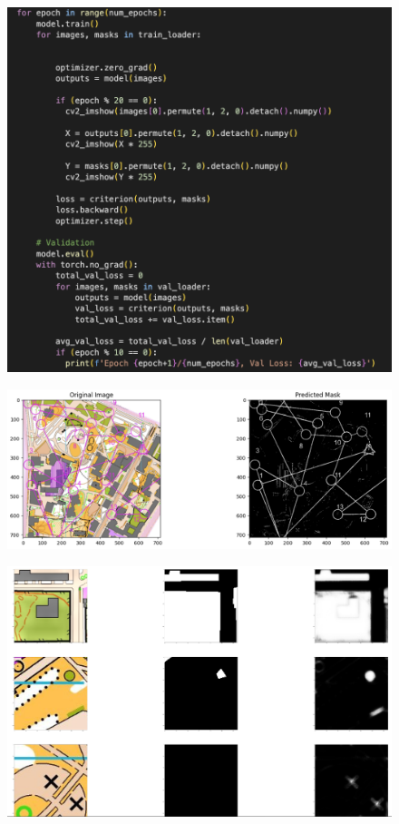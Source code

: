 \documentclass[a4paper,12pt]{extarticle}
\begin{document}
\begin{figure}[H]
    \centering
    \includegraphics[width=400pt]{CNN training loop.png}
    \label{fig:training-loop}
\end{figure}
\begin{figure}[H]
    \centering
    \includegraphics[width=\linewidth]{Predicted mask.png}
    \label{fig:prediction-CNN}
\end{figure}
\begin{figure}[H]
    \centering
    \includegraphics[width=\linewidth]{unet_runnable.png}
    \label{fig:unetrunnable}
\end{figure}
\end{document}
